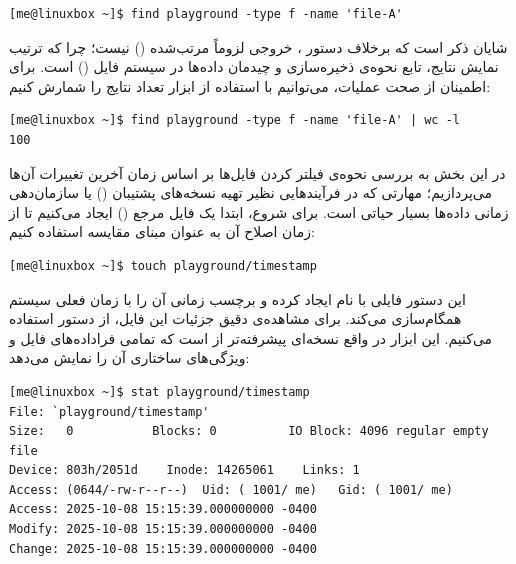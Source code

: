 \begin{latin}
\begin{lstlisting}
[me@linuxbox ~]$ find playground -type f -name 'file-A'
\end{lstlisting}
\end{latin}

شایان ذکر است که برخلاف دستور ، خروجی  لزوماً مرتب‌شده () نیست؛ چرا که ترتیب نمایش نتایج، تابع نحوه‌ی ذخیره‌سازی و چیدمان داده‌ها در سیستم فایل () است. برای اطمینان از صحت عملیات، می‌توانیم با استفاده از ابزار  تعداد نتایج را شمارش کنیم:

\begin{latin}
\begin{lstlisting}
[me@linuxbox ~]$ find playground -type f -name 'file-A' | wc -l
100
\end{lstlisting}
\end{latin}

در این بخش به بررسی نحوه‌ی فیلتر کردن فایل‌ها بر اساس زمان آخرین تغییرات آن‌ها می‌پردازیم؛ مهارتی که در فرآیندهایی نظیر تهیه نسخه‌های پشتیبان () یا سازمان‌دهی زمانی داده‌ها بسیار حیاتی است. برای شروع، ابتدا یک فایل مرجع () ایجاد می‌کنیم تا از زمان اصلاح آن به عنوان مبنای مقایسه استفاده کنیم:

\begin{latin}
\begin{lstlisting}
[me@linuxbox ~]$ touch playground/timestamp
\end{lstlisting}
\end{latin}

این دستور فایلی با نام  ایجاد کرده و برچسب زمانی آن را با زمان فعلی سیستم همگام‌سازی می‌کند. برای مشاهده‌ی دقیق جزئیات این فایل، از دستور  استفاده می‌کنیم. این ابزار در واقع نسخه‌ای پیشرفته‌تر از  است که تمامی فراداده‌های فایل و ویژگی‌های ساختاری آن را نمایش می‌دهد:

\begin{latin}
\begin{lstlisting}
[me@linuxbox ~]$ stat playground/timestamp
File: `playground/timestamp'
Size:   0           Blocks: 0          IO Block: 4096 regular empty file
Device: 803h/2051d    Inode: 14265061    Links: 1
Access: (0644/-rw-r--r--)  Uid: ( 1001/ me)   Gid: ( 1001/ me)
Access: 2025-10-08 15:15:39.000000000 -0400
Modify: 2025-10-08 15:15:39.000000000 -0400
Change: 2025-10-08 15:15:39.000000000 -0400
\end{lstlisting}
\end{latin}

